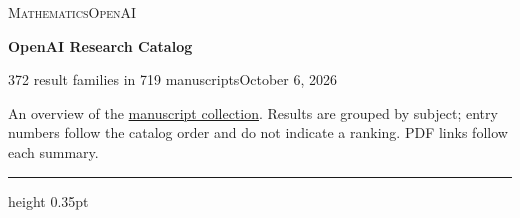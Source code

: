 \documentclass[11pt,a4paper]{article}
\begin{document}
\thispagestyle{firstpage}
{\small\scshape Mathematics\hfill OpenAI\par}
\vspace{5pt}
{\LARGE\bfseries OpenAI Research Catalog\par}
\vspace{4pt}
{\small 372 result families in 719 manuscripts\hfill October 6, 2026\par}
\vspace{7pt}
{\small An overview of the \href{https://github.com/openai/math}{manuscript collection}. Results are grouped by subject; entry numbers follow the catalog order and do not indicate a ranking. PDF links follow each summary.\par}
\vspace{8pt}\hrule height 0.35pt\vspace{5pt}
\end{document}
